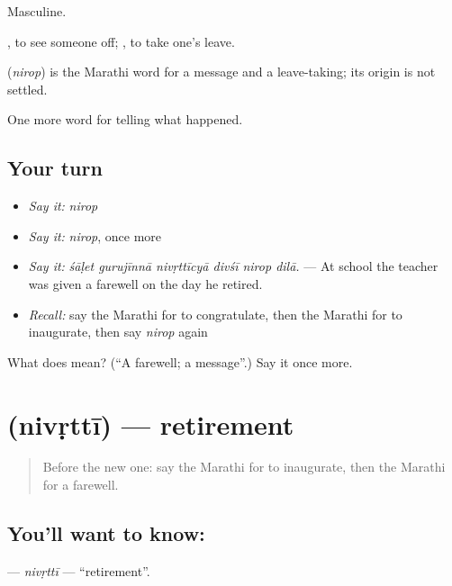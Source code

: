 Masculine.

 , to see someone off;  , to take one's leave.

\begin{cousinweb}
\textbf{} (\emph{nirop}) is the Marathi word for a message and a leave-taking; its origin is not settled.
\end{cousinweb}

\begin{grammarlens}[title={What you've built}]
One more word for telling what happened.
\end{grammarlens}

\subsection*{Your turn}
\begin{itemize}
\raggedright
  \item \emph{Say it:} \emph{nirop}
  \item \emph{Say it:} \emph{nirop}, once more
  \item \emph{Say it:} \emph{śāḷet gurujīnnā nivṛttīcyā divśī nirop dilā.} — At school the teacher was given a farewell on the day he retired.
  \item \emph{Recall:} say the Marathi for to congratulate, then the Marathi for to inaugurate, then say \emph{nirop} again
\end{itemize}

\begin{tcolorbox}[breakable,colback=teal!4,colframe=teal!35!black,title={Before you move on}]
What does  mean? (\textquotedblleft{}A farewell; a message\textquotedblright{}.) Say it once more.
\end{tcolorbox}
\section[\texorpdfstring{\mr{निवृत्ती} (nivṛttī)}{निवृत्ती (nivṛttī)}]{ (nivṛttī) — retirement}

\label{lesson:MR-C323-nivrtti}



\begin{quote}
Before the new one: say the Marathi for to inaugurate, then the Marathi for a farewell.
\end{quote}

\subsection*{You'll want to know: }
\textbf{} — \emph{nivṛttī} — \textquotedblleft{}retirement\textquotedblright{}.

